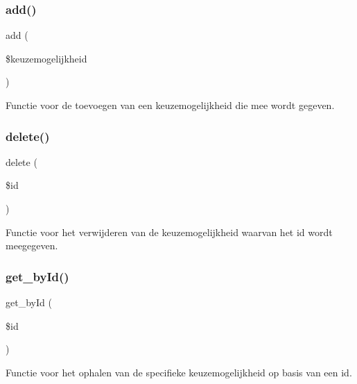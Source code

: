 \subsubsection{\texorpdfstring{add()}{add()}}
{\footnotesize\ttfamily add (\begin{DoxyParamCaption}\item[{}]{\$keuzemogelijkheid }\end{DoxyParamCaption})}



Functie voor de toevoegen van een keuzemogelijkheid die mee wordt gegeven. 

\mbox{\label{class_keuzemogelijkheid___model_a2f8258add505482d7f00ea26493a5723}} 
\subsubsection{\texorpdfstring{delete()}{delete()}}
{\footnotesize\ttfamily delete (\begin{DoxyParamCaption}\item[{}]{\$id }\end{DoxyParamCaption})}



Functie voor het verwijderen van de keuzemogelijkheid waarvan het id wordt meegegeven. 

\mbox{\label{class_keuzemogelijkheid___model_a98d28a4d9a29d40c5a8aa0176f19a919}} 
\subsubsection{\texorpdfstring{get\+\_\+by\+Id()}{get\_byId()}}
{\footnotesize\ttfamily get\+\_\+by\+Id (\begin{DoxyParamCaption}\item[{}]{\$id }\end{DoxyParamCaption})}



Functie voor het ophalen van de specifieke keuzemogelijkheid op basis van een id. 

